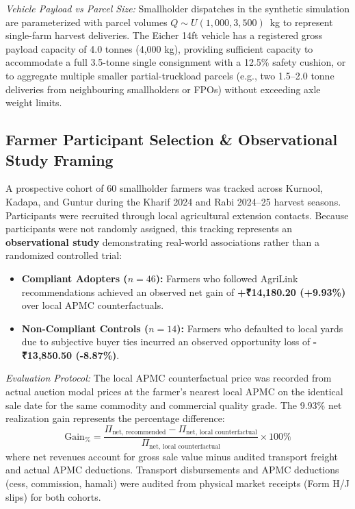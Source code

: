 \documentclass[journal]{IEEEtran}
\begin{document}
\textit{Vehicle Payload vs Parcel Size:} Smallholder dispatches in the synthetic simulation are parameterized with parcel volumes $Q \sim U(1,000, 3,500)$~kg to represent single-farm harvest deliveries. The Eicher 14ft vehicle has a registered gross payload capacity of 4.0 tonnes (4,000 kg), providing sufficient capacity to accommodate a full 3.5-tonne single consignment with a 12.5\% safety cushion, or to aggregate multiple smaller partial-truckload parcels (e.g., two 1.5--2.0 tonne deliveries from neighbouring smallholders or FPOs) without exceeding axle weight limits.

\subsection{Farmer Participant Selection \& Observational Study Framing}
A prospective cohort of 60 smallholder farmers was tracked across Kurnool, Kadapa, and Guntur during the Kharif 2024 and Rabi 2024--25 harvest seasons. Participants were recruited through local agricultural extension contacts. Because participants were not randomly assigned, this tracking represents an \textbf{observational study} demonstrating real-world associations rather than a randomized controlled trial:
\begin{itemize}
    \item \textbf{Compliant Adopters ($n = 46$):} Farmers who followed AgriLink recommendations achieved an observed net gain of \textbf{+₹14,180.20 (+9.93\%)} over local APMC counterfactuals.
    \item \textbf{Non-Compliant Controls ($n = 14$):} Farmers who defaulted to local yards due to subjective buyer ties incurred an observed opportunity loss of \textbf{-₹13,850.50 (-8.87\%)}.
\end{itemize}

\textit{Evaluation Protocol:} The local APMC counterfactual price was recorded from actual auction modal prices at the farmer's nearest local APMC on the identical sale date for the same commodity and commercial quality grade. The 9.93\% net realization gain represents the percentage difference:
\begin{equation}
\text{Gain}_{\%} = \frac{\Pi_{\text{net, recommended}} - \Pi_{\text{net, local counterfactual}}}{\Pi_{\text{net, local counterfactual}}} \times 100\%
\end{equation}
where net revenues account for gross sale value minus audited transport freight and actual APMC deductions. Transport disbursements and APMC deductions (cess, commission, hamali) were audited from physical market receipts (Form H/J slips) for both cohorts.
\end{document}
